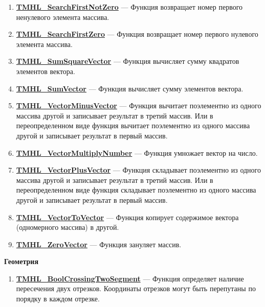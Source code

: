 \documentclass[a4paper,12pt]{article}
\begin{document}
\begin{enumerate}
\item \textbf{\hyperref[TMHL_SearchFirstNotZero]{TMHL\_SearchFirstNotZero}} --- Функция возвращает номер первого ненулевого элемента массива.

\item \textbf{\hyperref[TMHL_SearchFirstZero]{TMHL\_SearchFirstZero}} --- Функция возвращает номер первого нулевого элемента массива.

\item \textbf{\hyperref[TMHL_SumSquareVector]{TMHL\_SumSquareVector}} --- Функция вычисляет сумму квадратов элементов вектора.

\item \textbf{\hyperref[TMHL_SumVector]{TMHL\_SumVector}} --- Функция вычисляет сумму элементов вектора.

\item \textbf{\hyperref[TMHL_VectorMinusVector]{TMHL\_VectorMinusVector}} --- Функция вычитает поэлементно из одного массива другой и записывает результат в третий массив. Или в переопределенном виде функция вычитает поэлементно из одного массива другой и записывает результат в первый массив.

\item \textbf{\hyperref[TMHL_VectorMultiplyNumber]{TMHL\_VectorMultiplyNumber}} --- Функция умножает вектор на число.

\item \textbf{\hyperref[TMHL_VectorPlusVector]{TMHL\_VectorPlusVector}} --- Функция складывает поэлементно из одного массива другой и записывает результат в третий массив. Или в переопределенном виде функция складывает поэлементно из одного массива другой и записывает результат в первый массив.

\item \textbf{\hyperref[TMHL_VectorToVector]{TMHL\_VectorToVector}} --- Функция копирует содержимое вектора (одномерного массива) в другой.

\item \textbf{\hyperref[TMHL_ZeroVector]{TMHL\_ZeroVector}} --- Функция зануляет массив.

\end{enumerate}

\textbf{Геометрия}
\begin{enumerate}

\item \textbf{\hyperref[TMHL_BoolCrossingTwoSegment]{TMHL\_BoolCrossingTwoSegment}} --- Функция определяет наличие пересечения двух отрезков. Координаты отрезков могут быть перепутаны по порядку в каждом отрезке.

\end{enumerate}
\end{document}

